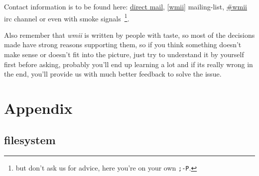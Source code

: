 \documentclass[12pt,a4paper]{article} %
\newcommand{\wmii}{\emph{wmii}}
\begin{document}
    Contact information is to be found here:
    \href{http://wmii.de/index.php/BeginnersGuide}{direct mail},
    \href{http://wmii.de/index.php/MailingList}{[wmii]} mailing-list,
    \href{http://wmii.de/index.php/IRC}{\#wmii} irc channel or even
    with smoke signals~\footnote{ but don't ask us for advice, here
      you're on your own \texttt{;-P}.}.

    Also remember that \wmii{} is written by people with taste, so most
    of the decisions made have strong reasons supporting them, so if
    you think something doesn't make sense or doesn't fit into the
    picture, just try to understand it by yourself first before
    asking, probably you'll end up learning a lot and if its really
    wrong in the end, you'll provide us with much better feedback to
    solve the issue.

    \newpage

    \section{Appendix}
    \label{sec:appendix}

    \subsection{filesystem}
\end{document}
